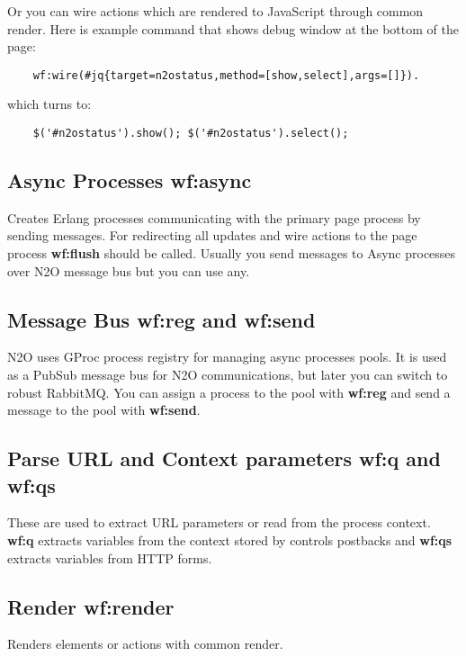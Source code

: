Or you can wire actions which are rendered to JavaScript through common render.
Here is example command that shows debug window at the bottom of the page:

\vspace{1\baselineskip}
\begin{lstlisting}
    wf:wire(#jq{target=n2ostatus,method=[show,select],args=[]}).
\end{lstlisting}
\vspace{1\baselineskip}

which turns to:

\vspace{1\baselineskip}
\begin{lstlisting}
    $('#n2ostatus').show(); $('#n2ostatus').select();
\end{lstlisting}

\subsection{Async Processes \bf{wf:async}}
Creates Erlang processes communicating with the primary page process by sending messages.
For redirecting all updates and wire actions to the page process {\bf wf:flush} should be called.
Usually you send messages to Async processes over N2O message bus but you can use any.

\subsection{Message Bus {\bf wf:reg} and {\bf wf:send}}
N2O uses GProc process registry for managing async processes pools.
It is used as a PubSub message bus for N2O communications, but later you can switch to robust RabbitMQ.
You can assign a process to the pool with {\bf wf:reg} and send a message to the pool with {\bf wf:send}.

\subsection{Parse URL and Context parameters {\bf wf:q} and {\bf wf:qs}}
These are used to extract URL parameters or read from the process context. {\bf wf:q} extracts variables
from the context stored by controls postbacks and {\bf wf:qs} extracts variables from HTTP forms.

\subsection{Render {\bf wf:render}}
Renders elements or actions with common render.

